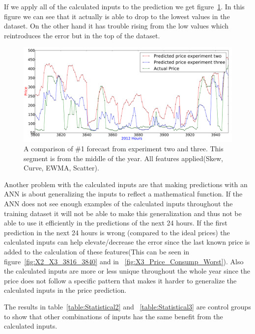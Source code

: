 If we apply all of the calculated inputs to the prediction we get figure~\ref{fig:X2_X3_AllParameters_3800_4000}. In this figure we can see that it actually is able to drop to the lowest values in the dataset. On the other hand it has trouble rising from the low values which reintroduces the error but in the top of the dataset.

\begin{figure}[H]
\centering
\includegraphics[width=\linewidth]{billeder/PriceExperimentalAnalysis/X2_X3_AllFeatures_3800_4000.png}
\caption{A comparison of \#1 forecast from experiment two and three. This segment is from the middle of the year. All features applied(Skew, Curve, EWMA, Scatter).}
\label{fig:X2_X3_AllParameters_3800_4000}
\end{figure}

Another problem with the calculated inputs are that making predictions with an ANN is about generalizing the inputs to reflect a mathematical function. If the ANN does not see enough examples of the calculated inputs throughout the training dataset it will not be able to make this generalization and thus not be able to use it efficiently in the predictions of the next 24 hours. If the first prediction in the next 24 hours is wrong (compared to the ideal prices) the calculated inputs can help elevate/decrease the error since the last known price is added to the calculation of these features(This can be seen in figure~\ref{fig:X2_X3_3816_3840} and in ~\ref{fig:X3_Price_Consump_Worst}). Also the calculated inputs are more or less unique throughout the whole year since the price does not follow a specific pattern that makes it harder to generalize the calculated inputs in the price prediction. 

The results in table~\ref{table:Statistical2} and ~\ref{table:Statistical3} are control groups to show that other combinations of inputs has the same benefit from the calculated inputs.

